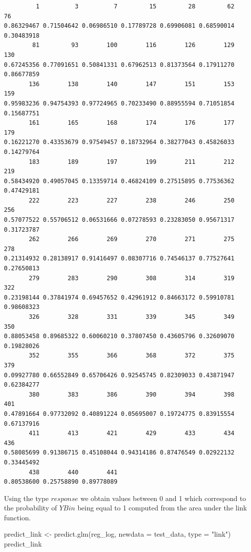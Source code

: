\documentclass[
]{article}
\newenvironment{Shaded}{\begin{snugshade}}{\end{snugshade}}
\newcommand{\AttributeTok}[1]{\textcolor[rgb]{0.77,0.63,0.00}{#1}}
\newcommand{\FunctionTok}[1]{\textcolor[rgb]{0.00,0.00,0.00}{#1}}
\newcommand{\NormalTok}[1]{#1}
\newcommand{\OtherTok}[1]{\textcolor[rgb]{0.56,0.35,0.01}{#1}}
\newcommand{\StringTok}[1]{\textcolor[rgb]{0.31,0.60,0.02}{#1}}
\begin{document}
\begin{verbatim}
         1          3          7         15         28         62         76 
0.86329467 0.71504642 0.06986510 0.17789728 0.69906081 0.68590014 0.30483918 
        81         93        100        116        126        129        130 
0.67245356 0.77091651 0.50841331 0.67962513 0.81373564 0.17911270 0.86677859 
       136        138        140        147        151        153        159 
0.95983236 0.94754393 0.97724965 0.70233490 0.88955594 0.71051854 0.15687751 
       161        165        168        174        176        177        179 
0.16221270 0.43353679 0.97549457 0.18732964 0.38277043 0.45826033 0.14279764 
       183        189        197        199        211        212        219 
0.58434920 0.49057045 0.13359714 0.46824109 0.27515895 0.77536362 0.47429181 
       222        223        227        238        246        250        256 
0.57077522 0.55706512 0.06531666 0.07278593 0.23283050 0.95671317 0.31723787 
       262        266        269        270        271        275        278 
0.21314932 0.28138917 0.91416497 0.08307716 0.74546137 0.77527641 0.27650813 
       279        283        290        308        314        319        322 
0.23198144 0.37841974 0.69457652 0.42961912 0.84663172 0.59910781 0.98608323 
       326        328        331        339        345        349        350 
0.88053458 0.89685322 0.60060210 0.37807450 0.43605796 0.32609070 0.19828026 
       352        355        366        368        372        375        379 
0.09927780 0.66552849 0.65706426 0.92545745 0.82309033 0.43871947 0.62384277 
       380        383        386        390        394        398        401 
0.47891664 0.97732092 0.40891224 0.05695007 0.19724775 0.83915554 0.67137916 
       411        413        421        429        433        434        436 
0.58085699 0.91386715 0.45108044 0.94314186 0.87476549 0.02922132 0.33445492 
       438        440        441 
0.80538600 0.25758890 0.89778089 
\end{verbatim}

Using the type \(response\) we obtain values between 0 and 1 which
correspond to the probability of \(YBin\) being equal to 1 computed from
the area under the link function.

\begin{Shaded}
\begin{Highlighting}[]
\NormalTok{predict\_link }\OtherTok{\textless{}{-}} \FunctionTok{predict.glm}\NormalTok{(reg\_log, }\AttributeTok{newdata =}\NormalTok{ test\_data, }\AttributeTok{type =} \StringTok{"link"}\NormalTok{)}
\NormalTok{predict\_link}
\end{Highlighting}
\end{Shaded}
\end{document}
